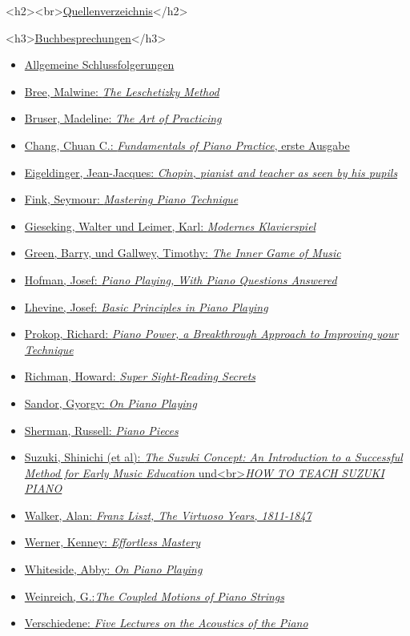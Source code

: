 <h2><br>\hyperlink{reference}{Quellenverzeichnis}</h2>

<h3>\underline{\hyperlink{reference}{Buchbesprechungen}}</h3>
\begin{itemize} 
 \item \hyperlink{allgemein}{Allgemeine Schlussfolgerungen}
 \item \hyperlink{Bree}{Bree, Malwine: \textit{The Leschetizky Method}}
 \item \hyperlink{Bruser}{Bruser, Madeline: \textit{The Art of Practicing}}
 \item \hyperlink{Chang}{Chang, Chuan C.: \textit{Fundamentals of Piano Practice}, erste Ausgabe}
 \item \hyperlink{Eigeldinger}{Eigeldinger, Jean-Jacques: \textit{Chopin, pianist and teacher as seen by his pupils}}
 \item \hyperlink{Fink}{Fink, Seymour: \textit{Mastering Piano Technique}}
 \item \hyperlink{Gieseking}{Gieseking, Walter und Leimer, Karl: \textit{Modernes Klavierspiel}}
 \item \hyperlink{Green}{Green, Barry, und Gallwey, Timothy: \textit{The Inner Game of Music}}
 \item \hyperlink{Hofman}{Hofman, Josef: \textit{Piano Playing, With Piano Questions Answered}}
 \item \hyperlink{Lhevine}{Lhevine, Josef: \textit{Basic Principles in Piano Playing}}
 \item \hyperlink{Prokop}{Prokop, Richard: \textit{Piano Power, a Breakthrough Approach to Improving your Technique}}
 \item \hyperlink{Richman}{Richman, Howard: \textit{Super Sight-Reading Secrets}}
 \item \hyperlink{Sandor}{Sandor, Gyorgy: \textit{On Piano Playing}}
 \item \hyperlink{Sherman}{Sherman, Russell: \textit{Piano Pieces}}
 \item \hyperlink{Suzuki}{Suzuki, Shinichi (et al): \textit{The Suzuki Concept: An Introduction to a Successful Method for Early Music Education} und<br>\textit{HOW TO TEACH SUZUKI PIANO}}
 \item \hyperlink{Walker}{Walker, Alan: \textit{Franz Liszt, The Virtuoso Years, 1811-1847}}
 \item \hyperlink{Werner}{Werner, Kenney: \textit{Effortless Mastery}}
 \item \hyperlink{Whiteside}{Whiteside, Abby: \textit{On Piano Playing}}
 \item \hyperlink{American}{Weinreich, G.:\textit{The Coupled Motions of Piano Strings}}
 \item \hyperlink{Lectures}{Verschiedene: \textit{Five Lectures on the Acoustics of the Piano}}
 \end{itemize}


